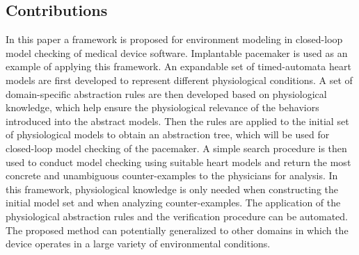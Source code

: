 \subsection{Contributions}
In this paper a framework is proposed for environment modeling in closed-loop model checking of medical device software.
Implantable pacemaker is used as an example of applying this framework.
An expandable set of timed-automata heart models are first developed to represent different physiological conditions. 
A set of domain-specific abstraction rules are then developed based on physiological knowledge, which help ensure the physiological relevance of the behaviors introduced into the abstract models. 
Then the rules are applied to the initial set of physiological models to obtain an abstraction tree, which will be used for closed-loop model checking of the pacemaker. 
A simple search procedure is then used to conduct model checking using suitable heart models and return the most concrete and unambiguous counter-examples to the physicians for analysis. 
In this framework, physiological knowledge is only needed when constructing the initial model set and when analyzing counter-examples. 
The application of the physiological abstraction rules and the verification procedure can be automated.
The proposed method can potentially generalized to other domains in which the device operates in a large variety of environmental conditions.

